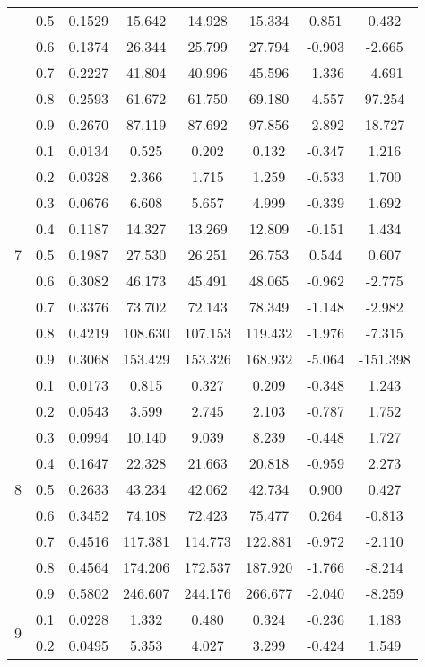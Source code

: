 \documentclass[11pt,a4paper]{report}
\begin{document}
\begin{longtable}{ | c | c || c | c | c | c | c | c | }
 & 0.5 & 0.1529 & 15.642 & 14.928 & 15.334 & 0.851 & 0.432 \\
 & 0.6 & 0.1374 & 26.344 & 25.799 & 27.794 & -0.903 & -2.665 \\
 & 0.7 & 0.2227 & 41.804 & 40.996 & 45.596 & -1.336 & -4.691 \\
 & 0.8 & 0.2593 & 61.672 & 61.750 & 69.180 & -4.557 & 97.254 \\
 & 0.9 & 0.2670 & 87.119 & 87.692 & 97.856 & -2.892 & 18.727 \\
 \hline
\multirow{9}{*}{7} & 0.1 & 0.0134 & 0.525 & 0.202 & 0.132 & -0.347 & 1.216 \\
 & 0.2 & 0.0328 & 2.366 & 1.715 & 1.259 & -0.533 & 1.700 \\
 & 0.3 & 0.0676 & 6.608 & 5.657 & 4.999 & -0.339 & 1.692 \\
 & 0.4 & 0.1187 & 14.327 & 13.269 & 12.809 & -0.151 & 1.434 \\
 & 0.5 & 0.1987 & 27.530 & 26.251 & 26.753 & 0.544 & 0.607 \\
 & 0.6 & 0.3082 & 46.173 & 45.491 & 48.065 & -0.962 & -2.775 \\
 & 0.7 & 0.3376 & 73.702 & 72.143 & 78.349 & -1.148 & -2.982 \\
 & 0.8 & 0.4219 & 108.630 & 107.153 & 119.432 & -1.976 & -7.315 \\
 & 0.9 & 0.3068 & 153.429 & 153.326 & 168.932 & -5.064 & -151.398 \\
 \hline
\multirow{9}{*}{8} & 0.1 & 0.0173 & 0.815 & 0.327 & 0.209 & -0.348 & 1.243 \\
 & 0.2 & 0.0543 & 3.599 & 2.745 & 2.103 & -0.787 & 1.752 \\
 & 0.3 & 0.0994 & 10.140 & 9.039 & 8.239 & -0.448 & 1.727 \\
 & 0.4 & 0.1647 & 22.328 & 21.663 & 20.818 & -0.959 & 2.273 \\
 & 0.5 & 0.2633 & 43.234 & 42.062 & 42.734 & 0.900 & 0.427 \\
 & 0.6 & 0.3452 & 74.108 & 72.423 & 75.477 & 0.264 & -0.813 \\
 & 0.7 & 0.4516 & 117.381 & 114.773 & 122.881 & -0.972 & -2.110 \\
 & 0.8 & 0.4564 & 174.206 & 172.537 & 187.920 & -1.766 & -8.214 \\
 & 0.9 & 0.5802 & 246.607 & 244.176 & 266.677 & -2.040 & -8.259 \\
 \hline
\multirow{9}{*}{9} & 0.1 & 0.0228 & 1.332 & 0.480 & 0.324 & -0.236 & 1.183 \\
 & 0.2 & 0.0495 & 5.353 & 4.027 & 3.299 & -0.424 & 1.549 \\

\end{longtable}
\end{document}
